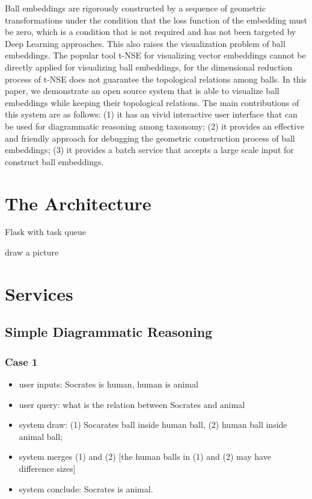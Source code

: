 \documentclass[runningheads]{llncs}
\begin{document}
Ball embeddings are rigorously constructed by a sequence of geometric transformations under the  condition that the loss function of the embedding must be zero, which is a condition that is not required and has not been targeted by Deep Learning approaches. This also raises the visualization problem of ball embeddings. The popular  tool t-NSE for visualizing vector embeddings cannot be directly applied for visualizing ball embeddings, for the dimensional reduction process of t-NSE does not guarantee the topological relations among balls. In this paper, we demonstrate an open source system that is able to visualize ball embeddings while keeping their topological relations. The main contributions of this system are as follows: (1) it has an vivid interactive user interface that can be used for diagrammatic reasoning among taxonomy; (2) it provides an effective and friendly approach for debugging the geometric construction process of ball embeddings; (3) it provides a batch service that accepts a large scale input for construct ball embeddings. 

\section{The Architecture}

Flask with task queue 

draw a picture

\section{Services}

\subsection{Simple Diagrammatic Reasoning}
\subsubsection{Case 1}
\begin{itemize}
	\item user inputs: Socrates is human, human is animal
	\item  user query: what is the relation between Socrates and animal
	\item  system draw: (1) Socarates ball inside human ball, (2) human ball inside animal ball; 
	\item system merges (1) and (2) [the human balls in (1) and (2) may have difference sizes]
	\item system conclude: Socrates is animal.
\end{itemize}
\end{document}
